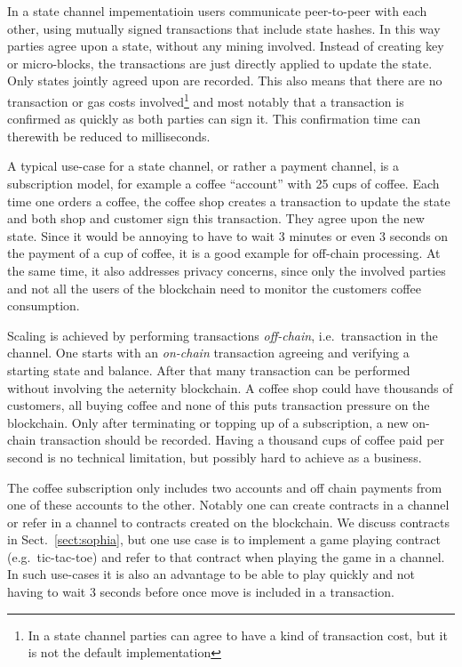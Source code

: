 In a state channel impementatioin users communicate peer-to-peer with
each other, using mutually signed transactions that include state
hashes. In this way parties agree upon a state, without any
mining involved. Instead of creating key or micro-blocks, the transactions are just
directly applied to update the state. Only states
jointly agreed upon are recorded. This also
means that there are no transaction or gas costs involved\footnote{In a state
channel parties can agree to have a kind of transaction cost, but it
is not the default implementation} and most notably that a transaction
is confirmed as quickly as both parties can sign it. This confirmation
time can therewith be reduced to milliseconds.

A typical use-case for a state channel, or rather a payment channel, is a subscription model, for
example a coffee ``account'' with 25 cups of coffee. Each time one
orders a coffee, the coffee shop
creates a transaction to update the state and both shop
and customer sign this transaction. They agree upon the new state.
Since it would be annoying to have to wait 3 minutes or even 3 seconds
on the payment of a cup of coffee, it is a good example for off-chain
processing. At the same time, it also addresses privacy concerns,
since only the involved parties and not all the users of the
blockchain need to monitor the customers coffee consumption.

Scaling is achieved by performing transactions \textit{off-chain},
i.e.\ transaction in the channel. One starts with an \textit{on-chain}
transaction agreeing and verifying a starting state and balance. After
that many transaction can be performed without involving the aeternity
blockchain. A coffee shop could have thousands of customers, all buying coffee and none of
this puts transaction pressure on the blockchain. Only after
terminating or topping up of a subscription, a new on-chain
transaction should be recorded. Having a thousand cups of coffee paid
per second is no technical limitation, but possibly hard to achieve as
a business.

The coffee subscription only includes two accounts and off chain
payments from one of these accounts to the other.
Notably one
can create contracts in a channel or refer in a channel to contracts
created on the blockchain. We discuss contracts in Sect.\
\ref{sect:sophia}, but one use case is to implement a game playing
contract (e.g.\ tic-tac-toe) and refer to that contract when playing the
game in a channel. In such use-cases it is also an advantage to be
able to play quickly and not having to wait 3 seconds before once move
is included in a transaction.

